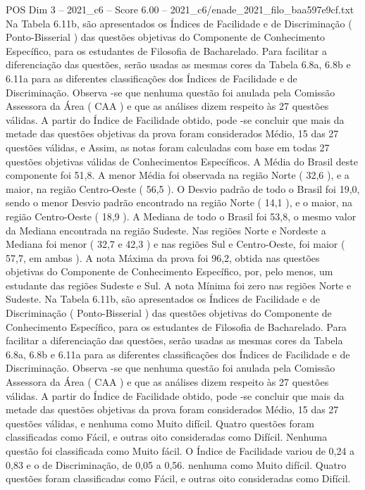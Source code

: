 \begin{textsample}{POS Dim 3 – 2021\_c6 – Score 6.00 – 2021\_c6/enade\_2021\_filo\_baa597e9cf.txt}
Na Tabela 6.11b, são apresentados os Índices de Facilidade e de Discriminação ( Ponto-Bisserial ) das questões objetivas do Componente de Conhecimento Específico, para os estudantes de Filosofia de Bacharelado.
Para facilitar a diferenciação das questões, serão usadas as mesmas cores da Tabela 6.8a, 6.8b e 6.11a para as diferentes classificações dos Índices de Facilidade e de Discriminação.
Observa -se que nenhuma questão foi anulada pela Comissão Assessora da Área ( CAA ) e que as análises dizem respeito às 27 questões válidas.
A partir do Índice de Facilidade obtido, pode -se concluir que mais da metade das questões objetivas da prova foram considerados Médio, 15 das 27 questões válidas, e Assim, as notas foram calculadas com base em todas 27 questões objetivas válidas de Conhecimentos Específicos.
A Média do Brasil deste componente foi 51,8.
A menor Média foi observada na região Norte ( 32,6 ), e a maior, na região Centro-Oeste ( 56,5 ).
O Desvio padrão de todo o Brasil foi 19,0, sendo o menor Desvio padrão encontrado na região Norte ( 14,1 ), e o maior, na região Centro-Oeste ( 18,9 ).
A Mediana de todo o Brasil foi 53,8, o mesmo valor da Mediana encontrada na região Sudeste.
Nas regiões Norte e Nordeste a Mediana foi menor ( 32,7 e 42,3 ) e nas regiões Sul e Centro-Oeste, foi maior ( 57,7, em ambas ).
A nota Máxima da prova foi 96,2, obtida nas questões objetivas do Componente de Conhecimento Específico, por, pelo menos, um estudante das regiões Sudeste e Sul.
A nota Mínima foi zero nas regiões Norte e Sudeste.
Na Tabela 6.11b, são apresentados os Índices de Facilidade e de Discriminação ( Ponto-Bisserial ) das questões objetivas do Componente de Conhecimento Específico, para os estudantes de Filosofia de Bacharelado.
Para facilitar a diferenciação das questões, serão usadas as mesmas cores da Tabela 6.8a, 6.8b e 6.11a para as diferentes classificações dos Índices de Facilidade e de Discriminação.
Observa -se que nenhuma questão foi anulada pela Comissão Assessora da Área ( CAA ) e que as análises dizem respeito às 27 questões válidas.
A partir do Índice de Facilidade obtido, pode -se concluir que mais da metade das questões objetivas da prova foram considerados Médio, 15 das 27 questões válidas, e nenhuma como Muito difícil.
Quatro questões foram classificadas como Fácil, e outras oito consideradas como Difícil.
Nenhuma questão foi classificada como Muito fácil.
O Índice de Facilidade variou de 0,24 a 0,83 e o de Discriminação, de 0,05 a 0,56. nenhuma como Muito difícil.
Quatro questões foram classificadas como Fácil, e outras oito consideradas como Difícil.

\end{textsample}
